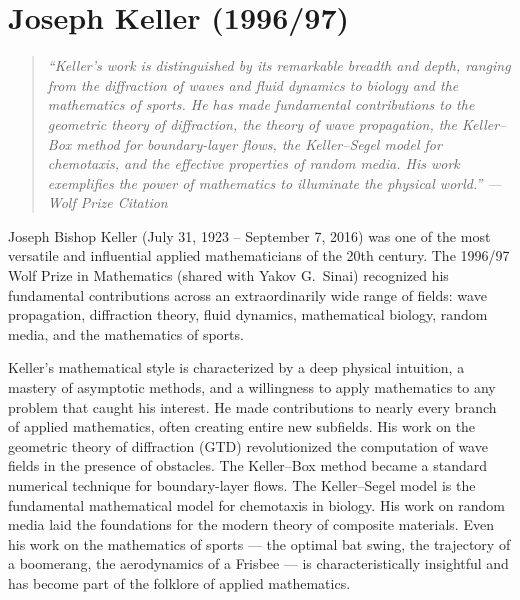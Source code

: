 \let\R\relax
\newcommand{\R}{\mathbb{R}}
\let\C\relax
\newcommand{\C}{\mathbb{C}}
\let\N\relax
\newcommand{\N}{\mathbb{N}}
\let\Z\relax
\newcommand{\Z}{\mathbb{Z}}
\let\Q\relax
\newcommand{\Q}{\mathbb{Q}}
\let\SO\relax
\newcommand{\SO}{\operatorname{SO}}
\let\SL\relax
\newcommand{\SL}{\operatorname{SL}}
\let\GL\relax
\newcommand{\GL}{\operatorname{GL}}
\let\St\relax
\newcommand{\St}{\operatorname{St}}
\let\GV\relax
\newcommand{\GV}{\operatorname{GV}}
\let\E\relax
\newcommand{\E}{\operatorname{E}}

\chapter{Joseph Keller (1996/97)}

\begin{quote}
\it ``Keller's work is distinguished by its remarkable breadth and depth, ranging from the diffraction of waves and fluid dynamics to biology and the mathematics of sports. He has made fundamental contributions to the geometric theory of diffraction, the theory of wave propagation, the Keller--Box method for boundary-layer flows, the Keller--Segel model for chemotaxis, and the effective properties of random media. His work exemplifies the power of mathematics to illuminate the physical world.'' --- Wolf Prize Citation
\end{quote}

Joseph Bishop Keller (July 31, 1923 -- September 7, 2016) was one of the most versatile and influential applied mathematicians of the 20th century. The 1996/97 Wolf Prize in Mathematics (shared with Yakov G.\ Sinai) recognized his fundamental contributions across an extraordinarily wide range of fields: wave propagation, diffraction theory, fluid dynamics, mathematical biology, random media, and the mathematics of sports.

Keller's mathematical style is characterized by a deep physical intuition, a mastery of asymptotic methods, and a willingness to apply mathematics to any problem that caught his interest. He made contributions to nearly every branch of applied mathematics, often creating entire new subfields. His work on the geometric theory of diffraction (GTD) revolutionized the computation of wave fields in the presence of obstacles. The Keller--Box method became a standard numerical technique for boundary-layer flows. The Keller--Segel model is the fundamental mathematical model for chemotaxis in biology. His work on random media laid the foundations for the modern theory of composite materials. Even his work on the mathematics of sports --- the optimal bat swing, the trajectory of a boomerang, the aerodynamics of a Frisbee --- is characteristically insightful and has become part of the folklore of applied mathematics.

